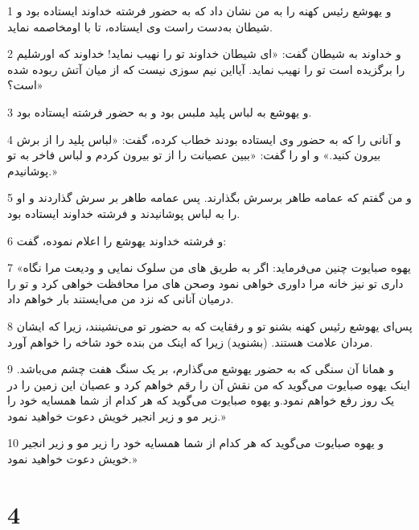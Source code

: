 \par 1 و یهوشع رئیس کهنه را به من نشان داد که به حضور فرشته خداوند ایستاده بود و شیطان به‌دست راست وی ایستاده، تا با اومخاصمه نماید.
\par 2 و خداوند به شیطان گفت: «ای شیطان خداوند تو را نهیب نماید! خداوند که اورشلیم را برگزیده است تو را نهیب نماید. آیااین نیم سوزی نیست که از میان آتش ربوده شده است؟»
\par 3 و یهوشع به لباس پلید ملبس بود و به حضور فرشته ایستاده بود.
\par 4 و آنانی را که به حضور وی ایستاده بودند خطاب کرده، گفت: «لباس پلید را از برش بیرون کنید.» و او را گفت: «ببین عصیانت را از تو بیرون کردم و لباس فاخر به تو پوشانیدم.»
\par 5 و من گفتم که عمامه طاهر برسرش بگذارند. پس عمامه طاهر بر سرش گذاردند و او را به لباس پوشانیدند و فرشته خداوند ایستاده بود.
\par 6 و فرشته خداوند یهوشع را اعلام نموده، گفت:
\par 7 «یهوه صبایوت چنین می‌فرماید: اگر به طریق های من سلوک نمایی و ودیعت مرا نگاه داری تو نیز خانه مرا داوری خواهی نمود وصحن های مرا محافظت خواهی کرد و تو را درمیان آنانی که نزد من می‌ایستند بار خواهم داد.
\par 8 پس‌ای یهوشع رئیس کهنه بشنو تو و رفقایت که به حضور تو می‌نشینند، زیرا که ایشان مردان علامت هستند. (بشنوید) زیرا که اینک من بنده خود شاخه را خواهم آورد.
\par 9 و همانا آن سنگی که به حضور یهوشع می‌گذارم، بر یک سنگ هفت چشم می‌باشد. اینک یهوه صبایوت می‌گوید که من نقش آن را رقم خواهم کرد و عصیان این زمین را در یک روز رفع خواهم نمود.و یهوه صبایوت می‌گوید که هر کدام از شما همسایه خود را زیر مو و زیر انجیر خویش دعوت خواهید نمود.»
\par 10 و یهوه صبایوت می‌گوید که هر کدام از شما همسایه خود را زیر مو و زیر انجیر خویش دعوت خواهید نمود.»

\chapter{4}

